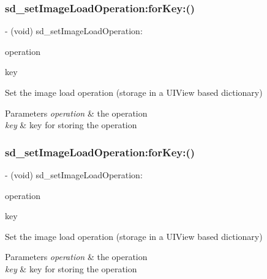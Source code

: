 \subsubsection{\texorpdfstring{sd\+\_\+set\+Image\+Load\+Operation\+:for\+Key\+:()}{sd\_setImageLoadOperation:forKey:()}\hspace{0.1cm}{\footnotesize\ttfamily [2/3]}}
{\footnotesize\ttfamily -\/ (void) sd\+\_\+set\+Image\+Load\+Operation\+: \begin{DoxyParamCaption}\item[{(id)}]{operation }\item[{forKey:(N\+S\+String $\ast$)}]{key }\end{DoxyParamCaption}}

Set the image load operation (storage in a U\+I\+View based dictionary)


\begin{DoxyParams}{Parameters}
{\em operation} & the operation \\
\hline
{\em key} & key for storing the operation \\
\hline
\end{DoxyParams}
\mbox{\label{category_u_i_view_07_web_cache_operation_08_a0ac55cce0483704f3a3aeda220469663}} 
\subsubsection{\texorpdfstring{sd\+\_\+set\+Image\+Load\+Operation\+:for\+Key\+:()}{sd\_setImageLoadOperation:forKey:()}\hspace{0.1cm}{\footnotesize\ttfamily [3/3]}}
{\footnotesize\ttfamily -\/ (void) sd\+\_\+set\+Image\+Load\+Operation\+: \begin{DoxyParamCaption}\item[{(id)}]{operation }\item[{forKey:(N\+S\+String $\ast$)}]{key }\end{DoxyParamCaption}}

Set the image load operation (storage in a U\+I\+View based dictionary)


\begin{DoxyParams}{Parameters}
{\em operation} & the operation \\
\hline
{\em key} & key for storing the operation \\
\hline
\end{DoxyParams}


